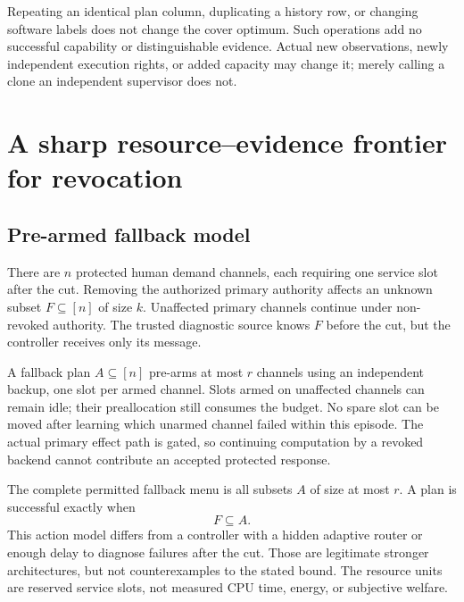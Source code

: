 \documentclass[11pt,a4paper]{article}
\theoremstyle{definition}\newtheorem{definition}{Definition}
\begin{document}
Repeating an identical plan column, duplicating a history row, or changing software labels does not change the cover optimum. Such operations add no successful capability or distinguishable evidence. Actual new observations, newly independent execution rights, or added capacity may change it; merely calling a clone an independent supervisor does not.

\section{A sharp resource--evidence frontier for revocation}
\label{sec:resource}
\subsection{Pre-armed fallback model}
There are $n$ protected human demand channels, each requiring one service slot after the cut. Removing the authorized primary authority affects an unknown subset $F\subseteq[n]$ of size $k$. Unaffected primary channels continue under non-revoked authority. The trusted diagnostic source knows $F$ before the cut, but the controller receives only its message.

A fallback plan $A\subseteq[n]$ pre-arms at most $r$ channels using an independent backup, one slot per armed channel. Slots armed on unaffected channels can remain idle; their preallocation still consumes the budget. No spare slot can be moved after learning which unarmed channel failed within this episode. The actual primary effect path is gated, so continuing computation by a revoked backend cannot contribute an accepted protected response.

The complete permitted fallback menu is all subsets $A$ of size at most $r$. A plan is successful exactly when
\begin{equation}
F\subseteq A.
\label{eq:subset}
\end{equation}
This action model differs from a controller with a hidden adaptive router or enough delay to diagnose failures after the cut. Those are legitimate stronger architectures, but not counterexamples to the stated bound. The resource units are reserved service slots, not measured CPU time, energy, or subjective welfare.
\end{document}
